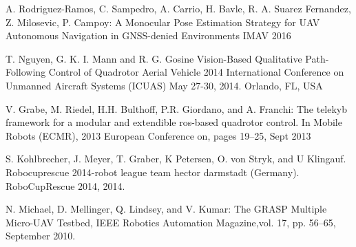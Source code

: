 \documentclass{styles/svproc}
\begin{document}
\begin{thebibliography}{6}
  A. Rodriguez-Ramos, C. Sampedro, A. Carrio, H. Bavle, R. A. Suarez Fernandez, Z. Milosevic, P. Campoy:  
  A Monocular Pose Estimation Strategy for UAV Autonomous Navigation in GNSS-denied Environments
  IMAV 2016
  
  T. Nguyen, G. K. I. Mann and R. G. Gosine
  Vision-Based Qualitative Path-Following Control of Quadrotor Aerial Vehicle
  2014 International Conference on Unmanned Aircraft Systems (ICUAS) May 27-30, 2014. Orlando, FL, USA

  V. Grabe, M. Riedel, H.H. Bulthoff, P.R. Giordano, and A. Franchi:
  The telekyb framework for a modular and extendible ros-based quadrotor control. 
  In Mobile Robots (ECMR), 2013 European Conference on, pages 19–25, Sept 2013

  S. Kohlbrecher, J. Meyer, T. Graber, K Petersen, O. von Stryk, and U Klingauf. 
  Robocuprescue 2014-robot league team hector darmstadt (Germany). 
  RoboCupRescue 2014, 2014.

  N. Michael, D. Mellinger, Q. Lindsey, and V. Kumar:
  The GRASP Multiple Micro-UAV Testbed, 
  IEEE Robotics Automation Magazine,vol. 17, pp. 56–65, September 2010.
\end{thebibliography}

        
\end{document}
